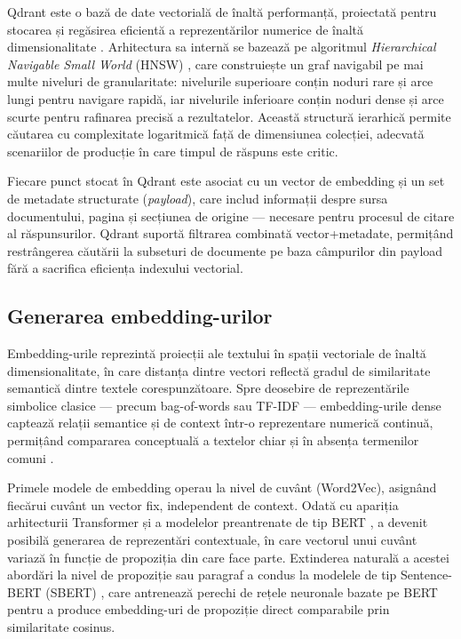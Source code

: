 \documentclass[12pt, a4paper, oneside, romanian]{teza-upb}
\begin{document}
Qdrant este o bază de date vectorială de înaltă performanță, proiectată pentru stocarea și regăsirea eficientă a reprezentărilor numerice de înaltă dimensionalitate \cite{qdrant_doc}. Arhitectura sa internă se bazează pe algoritmul \textit{Hierarchical Navigable Small World} (HNSW) \cite{malkov2018hnsw}, care construiește un graf navigabil pe mai multe niveluri de granularitate: nivelurile superioare conțin noduri rare și arce lungi pentru navigare rapidă, iar nivelurile inferioare conțin noduri dense și arce scurte pentru rafinarea precisă a rezultatelor. Această structură ierarhică permite căutarea cu complexitate logaritmică față de dimensiunea colecției, adecvată scenariilor de producție în care timpul de răspuns este critic.

Fiecare punct stocat în Qdrant este asociat cu un vector de embedding și un set de metadate structurate (\textit{payload}), care includ informații despre sursa documentului, pagina și secțiunea de origine — necesare pentru procesul de citare al răspunsurilor. Qdrant suportă filtrarea combinată vector+metadate, permițând restrângerea căutării la subseturi de documente pe baza câmpurilor din payload fără a sacrifica eficiența indexului vectorial.\cite{qdrant_doc}

\subsection{Generarea embedding-urilor}

Embedding-urile reprezintă proiecții ale textului în spații vectoriale de înaltă dimensionalitate, în care distanța dintre vectori reflectă gradul de similaritate semantică dintre textele corespunzătoare. Spre deosebire de reprezentările simbolice clasice — precum bag-of-words sau TF-IDF — embedding-urile dense captează relații semantice și de context 
într-o reprezentare numerică continuă, permițând compararea conceptuală a textelor chiar și în absența termenilor comuni \cite{mikolov2013word2vec}.

Primele modele de embedding operau la nivel de cuvânt (Word2Vec), asignând fiecărui cuvânt un vector fix, independent de context. Odată cu apariția arhitecturii Transformer și a modelelor preantrenate de tip BERT \cite{devlin2018bert}, a devenit posibilă generarea de reprezentări contextuale, în care vectorul unui cuvânt variază în funcție de propoziția din care face parte. Extinderea naturală a acestei abordări la nivel de propoziție sau paragraf a condus la modelele de tip Sentence-BERT (SBERT) \cite{reimers2019sbert}, care antrenează perechi de rețele neuronale bazate pe BERT pentru a produce embedding-uri de propoziție direct comparabile prin similaritate cosinus.
\end{document}
